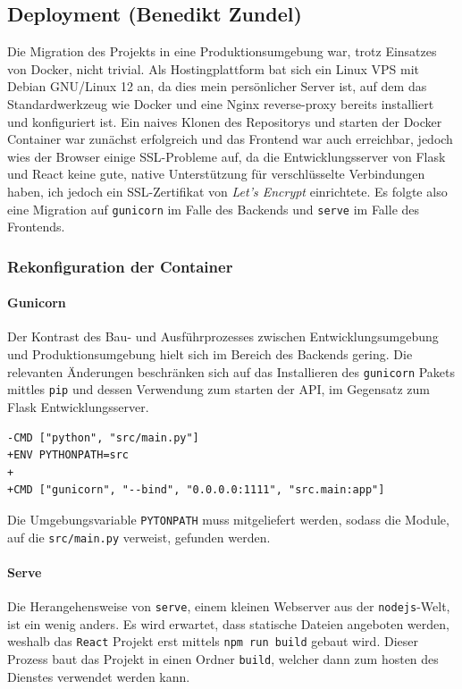 \documentclass{article}
\begin{document}
\subsection{Deployment \small{(Benedikt Zundel)}}
Die Migration des Projekts in eine Produktionsumgebung war, trotz Einsatzes von Docker, nicht trivial. Als Hostingplattform bat sich ein Linux VPS mit Debian GNU/Linux 12 an, da dies mein persönlicher Server ist, auf dem das Standardwerkzeug wie Docker und eine Nginx reverse-proxy bereits installiert und konfiguriert ist. Ein naives Klonen des Repositorys und starten der Docker Container war zunächst erfolgreich und das Frontend war auch erreichbar, jedoch wies der Browser einige SSL-Probleme auf, da die Entwicklungsserver von Flask und React keine gute, native Unterstützung für verschlüsselte Verbindungen haben, ich jedoch ein SSL-Zertifikat von \textit{Let's Encrypt} einrichtete. Es folgte also eine Migration auf \texttt{gunicorn} im Falle des Backends und \texttt{serve} im Falle des Frontends.

\subsubsection{Rekonfiguration der Container}
\paragraph{Gunicorn}
Der Kontrast des Bau- und Ausführprozesses zwischen Entwicklungsumgebung und Produktionsumgebung hielt sich im Bereich des Backends gering. Die relevanten Änderungen beschränken sich auf das Installieren des \texttt{gunicorn} Pakets mittles \texttt{pip} und dessen Verwendung zum starten der API, im Gegensatz zum Flask Entwicklungsserver.

\begin{lstlisting}[caption=Unterschiede im Backend Dockerfile]
-CMD ["python", "src/main.py"]
+ENV PYTHONPATH=src
+
+CMD ["gunicorn", "--bind", "0.0.0.0:1111", "src.main:app"]
\end{lstlisting}

Die Umgebungsvariable \texttt{PYTONPATH} muss mitgeliefert werden, sodass die Module, auf die \texttt{src/main.py} verweist, gefunden werden.

\paragraph{Serve}
Die Herangehensweise von \texttt{serve}, einem kleinen Webserver aus der \texttt{nodejs}-Welt, ist ein wenig anders. Es wird erwartet, dass statische Dateien angeboten werden, weshalb das \texttt{React} Projekt erst mittels \texttt{npm run build} gebaut wird. Dieser Prozess baut das Projekt in einen Ordner \texttt{build}, welcher dann zum hosten des Dienstes verwendet werden kann.
\end{document}
